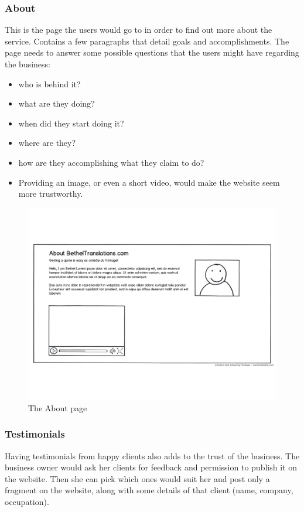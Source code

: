 \documentclass{l3proj}
\begin{document}
\subsubsection{About}
This is the page the users would go to in order to find out more about the
service. Contains a few paragraphs that detail goals and accomplishments.
The page needs to answer some possible questions that the users might have
regarding the business:
\begin{itemize}
	\item who is behind it?
	\item what are they doing?
	\item when did they start doing it?
	\item where are they?
	\item how are they accomplishing what they claim to do?
	\item Providing an image, or even a short video, would make the website seem
	more trustworthy.
\end{itemize}

\begin{figure}
\label{wireframes:about}
\begin{center}
\includegraphics[width=\linewidth, trim = 0px 110px 0px 100px]{wireframes/about}
\caption{The About page}
\end{center}
\end{figure}


\subsubsection{Testimonials}
Having testimonials from happy clients also adds to the trust of the business.
The business owner would ask her clients for feedback and permission to publish
it on the website. Then she can pick which ones would suit her and post only a
fragment on the website, along with some details of that client (name, company,
occupation).
\end{document}
